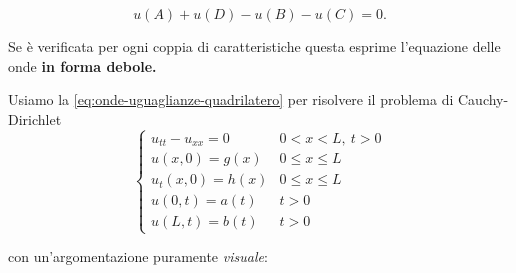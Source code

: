\documentclass[10pt,a4paper,twoside,openright]{book}
\begin{document}
\begin{enumerate}
	\begin{equation}
		u( A) +u( D) -u( B) -u( C) =0.
		\label{eq:onde-uguaglianze-quadrilatero}
	\end{equation}

	Se è verificata per ogni coppia di caratteristiche questa esprime l'equazione delle onde \textbf{in forma debole.}

	Usiamo la \eqref{eq:onde-uguaglianze-quadrilatero} per risolvere il problema di Cauchy-Dirichlet
	\begin{equation*}
		\begin{cases}
			u_{tt} -u_{xx} =0  & 0< x< L,\ t >0          \\
			u( x,0) =g( x)     & 0\leqslant x\leqslant L \\
			u_{t}( x,0) =h( x) & 0\leqslant x\leqslant L \\
			u( 0,t) =a( t)     & t >0                    \\
			u( L,t) =b( t)     & t >0                    
		\end{cases}
	\end{equation*}

	con un'argomentazione puramente \textit{visuale}:

	\begin{figure}[htpb]
		\centering
		
		\begin{tikzpicture}[x=0.75pt,y=0.75pt,yscale=-1,xscale=1]
			

\end{tikzpicture}
\end{figure}
\end{enumerate}
\end{document}
